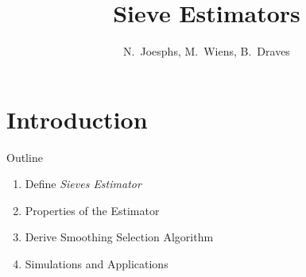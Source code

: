 \documentclass{beamer}
\title{Sieve Estimators}
\subtitle{}
\author{N.~Joesphs, M.~Wiens, B.~Draves}
\begin{document}
\begin{frame}%
  \titlepage
\end{frame}

\section{Introduction} 

\begin{frame}{Outline} %
\begin{enumerate}
\item Define \textit{Sieves Estimator}
\item Properties of the Estimator
\item Derive Smoothing Selection Algorithm
\item Simulations and Applications 
\end{enumerate}
\end{frame}
\end{document}
